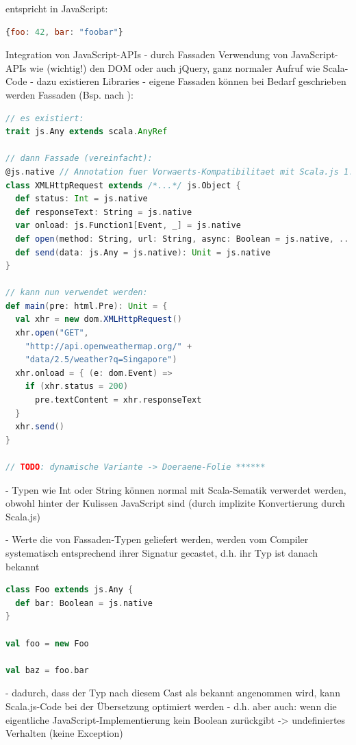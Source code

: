 \documentclass[a4paper, 12pt, hidelinks, listof=totoc, listoftables=totoc, bibliography=totoc]{scrreprt}
\begin{document}
entspricht in JavaScript:
\begin{lstlisting}[language=JavaScript]
{foo: 42, bar: "foobar"}
\end{lstlisting}


Integration von JavaScript-APIs
- durch Fassaden Verwendung von JavaScript-APIs wie (wichtig!) den DOM oder auch jQuery, ganz normaler Aufruf wie Scala-Code
	- dazu existieren Libraries
	- eigene Fassaden können bei Bedarf geschrieben werden
		Fassaden (Bsp. nach \cite{doeraene2015.SSP}):

\begin{lstlisting}[language=Scala]
// es existiert:
trait js.Any extends scala.AnyRef

// dann Fassade (vereinfacht):
@js.native // Annotation fuer Vorwaerts-Kompatibilitaet mit Scala.js 1.0.0
class XMLHttpRequest extends /*...*/ js.Object {
  def status: Int = js.native
  def responseText: String = js.native
  var onload: js.Function1[Event, _] = js.native
  def open(method: String, url: String, async: Boolean = js.native, ...): Unit = js.native
  def send(data: js.Any = js.native): Unit = js.native
}

// kann nun verwendet werden:
def main(pre: html.Pre): Unit = {
  val xhr = new dom.XMLHttpRequest()
  xhr.open("GET",
    "http://api.openweathermap.org/" +
    "data/2.5/weather?q=Singapore")
  xhr.onload = { (e: dom.Event) =>
    if (xhr.status = 200)
      pre.textContent = xhr.responseText
  }
  xhr.send()
}

// TODO: dynamische Variante -> Doeraene-Folie ******
\end{lstlisting}
- Typen wie Int oder String können normal mit Scala-Sematik verwerdet werden, obwohl hinter der Kulissen JavaScript sind (durch implizite Konvertierung durch Scala.js)


- Werte die von Fassaden-Typen geliefert werden, werden vom Compiler systematisch entsprechend ihrer Signatur gecastet, d.h. ihr Typ ist danach bekannt

\begin{lstlisting}[language=Scala]
class Foo extends js.Any {
  def bar: Boolean = js.native
}

val foo = new Foo

val baz = foo.bar
\end{lstlisting}

- dadurch, dass der Typ nach diesem Cast als bekannt angenommen wird, kann Scala.js-Code bei der Übersetzung optimiert werden
- d.h. aber auch: wenn die eigentliche JavaScript-Implementierung kein Boolean zurückgibt -> undefiniertes Verhalten (keine Exception)
\cite{doeraene2015.SSP}
\end{document}
